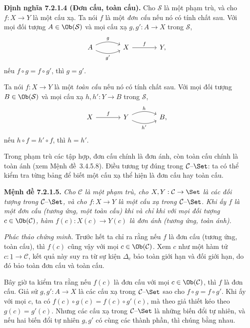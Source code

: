 \noindent\textbf{Định nghĩa 7.2.1.4 (Đơn cấu, toàn cấu).}\keepwithnext
Cho $\mathcal S$ là một phạm trù, và cho $f:X\to Y$ là một cấu xạ. Ta nói $f$ là một \emph{đơn cấu} nếu nó có tính chất sau. Với mọi đối tượng $A\in\Ob(\mathcal S)$ và mọi cấu xạ $g,g':A\to X$ trong $\mathcal S$,
\[
\begin{tikzcd}[column sep=large]
A\arrow[r,bend left=25,"g"]\arrow[r,bend right=25,"g'"']&X\arrow[r,"f"]&Y,
\end{tikzcd}
\]
nếu $f\circ g=f\circ g'$, thì $g=g'$.

Ta nói $f:X\to Y$ là một \emph{toàn cấu} nếu nó có tính chất sau. Với mọi đối tượng $B\in\Ob(\mathcal S)$ và mọi cấu xạ $h,h':Y\to B$ trong $\mathcal S$,
\[
\begin{tikzcd}[column sep=large]
X\arrow[r,"f"]&Y\arrow[r,bend left=25,"h"]\arrow[r,bend right=25,"h'"']&B,
\end{tikzcd}
\]
nếu $h\circ f=h'\circ f$, thì $h=h'$.

Trong phạm trù các tập hợp, đơn cấu chính là đơn ánh, còn toàn cấu chính là toàn ánh (xem Mệnh đề~3.4.5.8). Điều tương tự đúng trong $\mathcal C\text{--}\Set$: ta có thể kiểm tra từng bảng để biết một cấu xạ thể hiện là đơn cấu hay toàn cấu.

\noindent\textbf{Mệnh đề 7.2.1.5.}\keepwithnext
\emph{Cho $\mathcal C$ là một phạm trù, cho $X,Y:\mathcal C\to\Set$ là các đối tượng trong $\mathcal C\text{--}\Set$, và cho $f:X\to Y$ là một cấu xạ trong $\mathcal C\text{--}\Set$. Khi ấy $f$ là một đơn cấu (tương ứng, một toàn cấu) khi và chỉ khi với mọi đối tượng $c\in\Ob(\mathcal C)$, hàm $f(c):X(c)\to Y(c)$ là đơn ánh (tương ứng, toàn ánh).}

\noindent\textit{Phác thảo chứng minh.}
Trước hết ta chỉ ra rằng nếu $f$ là đơn cấu (tương ứng, toàn cấu), thì $f(c)$ cũng vậy với mọi $c\in\Ob(\mathcal C)$. Xem $c$ như một hàm tử $c:\underline1\to\mathcal C$, kết quả này suy ra từ sự kiện $\Delta_c$ bảo toàn giới hạn và đối giới hạn, do đó bảo toàn đơn cấu và toàn cấu.

Bây giờ ta kiểm tra rằng nếu $f(c)$ là đơn cấu với mọi $c\in\Ob(\mathcal C)$, thì $f$ là đơn cấu. Giả sử $g,g':A\to X$ là các cấu xạ trong $\mathcal C\text{--}\Set$ sao cho $f\circ g=f\circ g'$. Khi ấy với mọi $c$, ta có $f(c)\circ g(c)=f(c)\circ g'(c)$, mà theo giả thiết kéo theo $g(c)=g'(c)$. Nhưng các cấu xạ trong $\mathcal C\text{--}\Set$ là những biến đổi tự nhiên, và nếu hai biến đổi tự nhiên $g,g'$ có cùng các thành phần, thì chúng bằng nhau.

